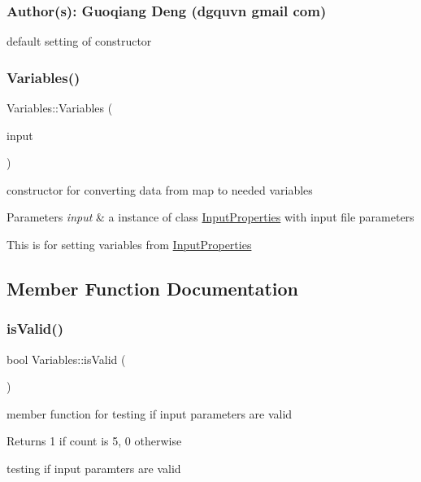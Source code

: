 \subsubsection*{Author(s)\+: Guoqiang Deng (dgquvn  gmail  com) }

default setting of constructor \mbox{\label{a00642_a66bbfb4d63737e90ece8511402e594d0}} 
\subsubsection{\texorpdfstring{Variables()}{Variables()}\hspace{0.1cm}{\footnotesize\ttfamily [2/2]}}
{\footnotesize\ttfamily Variables\+::\+Variables (\begin{DoxyParamCaption}\item[{const \hyperlink{a00634}{Input\+Properties} \&}]{input }\end{DoxyParamCaption})}

constructor for converting data from map to needed variables 
\begin{DoxyParams}{Parameters}
{\em input} & a instance of class \hyperlink{a00634}{Input\+Properties} with input file parameters\\
\hline
\end{DoxyParams}
This is for setting variables from \hyperlink{a00634}{Input\+Properties} 

\subsection{Member Function Documentation}
\mbox{\label{a00642_af81f777f4eac8f6ac44791bdea009d1a}} 
\subsubsection{\texorpdfstring{is\+Valid()}{isValid()}}
{\footnotesize\ttfamily bool Variables\+::is\+Valid (\begin{DoxyParamCaption}{ }\end{DoxyParamCaption})}

member function for testing if input parameters are valid \begin{DoxyReturn}{Returns}
1 if count is 5, 0 otherwise
\end{DoxyReturn}
testing if input paramters are valid \mbox{\label{a00642_ad66b5ab4971f5f66b2c5db102b22c4ae}} 

